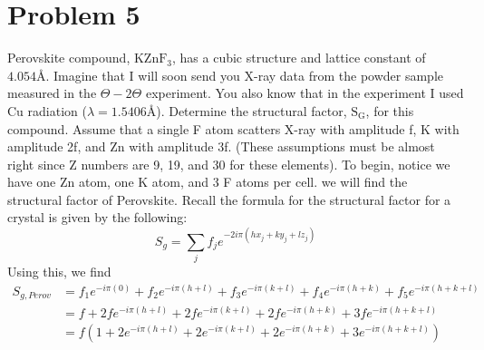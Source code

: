 \documentclass{article}
\begin{document}
\section*{Problem 5} Perovskite compound, $\text{KZnF}_3$, has a cubic structure and lattice constant of $4.054 \text{\AA}$. Imagine that I will soon send you X-ray data from the powder sample measured in the $\Theta - 2\Theta$ experiment. You also know that in the experiment I used Cu radiation ($\lambda = 1.5406 \text{\AA}$). Determine the structural factor, $\text{S}_{\text{G}}$, for this compound. Assume that a single F atom scatters X-ray with amplitude f, K with amplitude 2f, and Zn with amplitude 3f. (These assumptions must be almost right since Z numbers are 9, 19, and 30 for these elements).
\newline\newline
To begin, notice we have one Zn atom, one K atom, and 3 F atoms per cell. we will find the structural factor of Perovskite. Recall the formula for the structural factor for a crystal is given by the following:
\[S_g = \sum_j f_je^{-2i\pi(hx_j + ky_j + lz_j)}\]
Using this, we find
\begin{align*}
    S_{g,Perov} &= f_1e^{-i\pi(0)} + f_2e^{-i\pi(h + l)} + f_3e^{-i\pi(k + l)} + f_4e^{-i\pi(h + k)} + f_5e^{-i\pi(h + k + l)} \\
    &= f + 2fe^{-i\pi(h+l)} + 2fe^{-i\pi(k+l)} + 2fe^{-i\pi(h + k)} + 3fe^{-i\pi(h + k + l)} \\
    &= f(1 + 2e^{-i\pi(h + l)} + 2e^{-i\pi(k+l)} + 2e^{-i\pi(h + k)} + 3e^{-i\pi(h + k + l)}) \\
 \end{align*}
\end{document}

